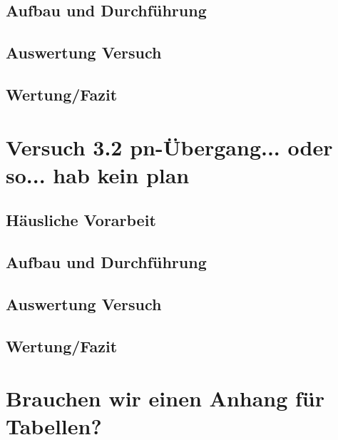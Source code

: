 \documentclass[a4paper]{scrartcl}
\numberwithin{equation}{subsection}
\begin{document}
\newpage

\subsection{Aufbau und Durchführung}

\newpage

\subsection{Auswertung Versuch}

\newpage

\subsection{Wertung/Fazit}

\newpage


\section{Versuch 3.2 pn-Übergang... oder so... hab kein plan}
\subsection{Häusliche Vorarbeit}

\newpage

\subsection{Aufbau und Durchführung}

\newpage

\subsection{Auswertung Versuch}

\newpage

\subsection{Wertung/Fazit}

\newpage

\section{Brauchen wir einen Anhang für Tabellen?}

\newpage






\label{LastPage}
\end{document}
